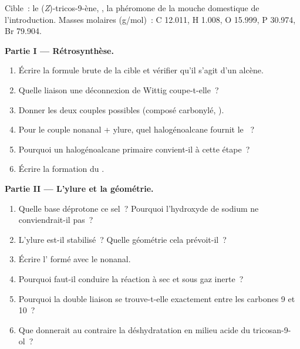 \begin{problem}
\label{pb:b2:wittig:1}
Cible~: le (\textit{Z})-tricos-9-ène, , la phéromone de la mouche
domestique de l'introduction. Masses molaires (\unit{g/mol})~: C 12.011, H 1.008, O 15.999, P 30.974, Br 79.904.

\medskip
\noindent\textbf{Partie I --- Rétrosynthèse.}
\begin{enumerate}
  \item Écrire la formule brute de la cible et vérifier qu'il s'agit d'un alcène.
  \item Quelle liaison une déconnexion de Wittig coupe-t-elle~?
  \item Donner les deux couples possibles (composé carbonylé, ).
  \item Pour le couple nonanal + ylure, quel halogénoalcane fournit le ~?
  \item Pourquoi un halogénoalcane primaire convient-il à cette étape~?
  \item Écrire la formation du .
\end{enumerate}

\medskip
\noindent\textbf{Partie II --- L'ylure et la géométrie.}
\begin{enumerate}[resume]
  \item Quelle base déprotone ce sel~? Pourquoi l'hydroxyde de sodium ne conviendrait-il pas~?
  \item L'ylure est-il stabilisé~? Quelle géométrie cela prévoit-il~?
  \item Écrire l' formé avec le nonanal.
  \item Pourquoi faut-il conduire la réaction à sec et sous gaz inerte~?
  \item Pourquoi la double liaison se trouve-t-elle exactement entre les carbones 9 et 10~?
  \item Que donnerait au contraire la déshydratation en milieu acide du tricosan-9-ol~?
\end{enumerate}


\end{problem}
